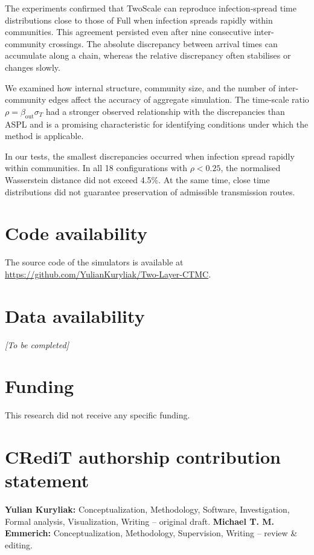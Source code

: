 \documentclass{ieeeaccess}
\newcommand{\Full}{\textup{Full}}
\newcommand{\TS}{\textup{TwoScale}}
\begin{document}
The experiments confirmed that \TS{} can reproduce infection-spread time distributions close to those of \Full{} when infection spreads rapidly within communities. This agreement persisted even after nine consecutive inter-community crossings. The absolute discrepancy between arrival times can accumulate along a chain, whereas the relative discrepancy often stabilises or changes slowly.

We examined how internal structure, community size, and the number of inter-community edges affect the accuracy of aggregate simulation. The time-scale ratio $\rho=\beta_{\mathrm{out}}\sigma_T$ had a stronger observed relationship with the discrepancies than ASPL and is a promising characteristic for identifying conditions under which the method is applicable.

In our tests, the smallest discrepancies occurred when infection spread rapidly within communities. In all 18 configurations with $\rho<0.25$, the normalised Wasserstein distance did not exceed 4.5\%. At the same time, close time distributions did not guarantee preservation of admissible transmission routes.



\section*{Code availability}
The source code of the simulators is available at
\url{https://github.com/YulianKuryliak/Two-Layer-CTMC}.

\section*{Data availability}
\textit{[To be completed]}

\section*{Funding}
This research did not receive any specific funding.

\section*{CRediT authorship contribution statement}

\textbf{Yulian Kuryliak:} Conceptualization, Methodology, Software,
Investigation, Formal analysis, Visualization, Writing -- original draft.
\textbf{Michael T. M. Emmerich:} Conceptualization, Methodology, Supervision,
Writing -- review \& editing.
\end{document}
